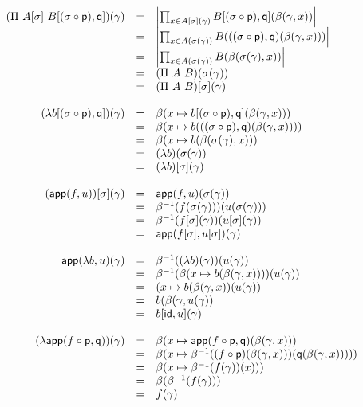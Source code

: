 \[
  \begin{array}{rcl}
    (\Pi\ A[\sigma]\ B[(\sigma \circ \mathsf{p}), \mathsf{q}])(\gamma)
    &=& \left|
      \prod_{x \in A[\sigma](\gamma)}
      B[(\sigma \circ \mathsf{p}), \mathsf{q}](\beta(\gamma, x))
    \right| \\
    &=& \left|
      \prod_{x \in A(\sigma(\gamma))}
      B(((\sigma \circ \mathsf{p}), \mathsf{q})(\beta(\gamma, x)))
    \right| \\
    &=& \left|\prod_{x \in A(\sigma(\gamma))} B(\beta(\sigma(\gamma),x))\right| \\
    &=& (\Pi\ A\ B)(\sigma(\gamma)) \\
    &=& (\Pi\ A\ B)[\sigma](\gamma) \\
    \\
    (\lambda b[(\sigma \circ \mathsf{p}), \mathsf{q}])(\gamma)
    &=& \beta(x \mapsto b[(\sigma \circ \mathsf{p}), \mathsf{q}](\beta(\gamma,x))) \\
    &=& \beta(x \mapsto b(((\sigma \circ \mathsf{p}), \mathsf{q})(\beta(\gamma,x)))) \\
    &=& \beta(x \mapsto b(\beta(\sigma(\gamma), x))) \\
    &=& (\lambda b)(\sigma(\gamma)) \\
    &=& (\lambda b)[\sigma](\gamma) \\
    \\
    (\mathsf{app}(f,u))[\sigma](\gamma)
    &=& \mathsf{app}(f,u)(\sigma(\gamma)) \\
    &=& \beta^{-1}(f(\sigma(\gamma)))(u(\sigma(\gamma))) \\
    &=& \beta^{-1}(f[\sigma](\gamma))(u[\sigma](\gamma)) \\
    &=& \mathsf{app}(f[\sigma], u[\sigma])(\gamma) \\
    \\
    \mathsf{app}(\lambda b, u)(\gamma)
    &=& \beta^{-1}((\lambda b)(\gamma))(u(\gamma)) \\
    &=& \beta^{-1}(\beta(x \mapsto b(\beta(\gamma,x))))(u(\gamma)) \\
    &=& (x \mapsto b(\beta(\gamma,x))(u(\gamma)) \\
    &=& b(\beta(\gamma, u(\gamma)) \\
    &=& b[\mathsf{id}, u](\gamma) \\
    \\
    (\lambda \mathsf{app}(f \circ \mathsf{p}, \mathsf{q}))(\gamma)
    &=& \beta(x \mapsto \mathsf{app}(f \circ \mathsf{p}, \mathsf{q})(\beta(\gamma,x))) \\
    &=& \beta(x \mapsto \beta^{-1}((f \circ \mathsf{p})(\beta(\gamma,x)))(\mathsf{q}(\beta(\gamma,x))))) \\
    &=& \beta(x \mapsto \beta^{-1}(f(\gamma))(x))) \\
    &=& \beta(\beta^{-1}(f(\gamma))) \\
    &=& f(\gamma)
  \end{array}
\]
